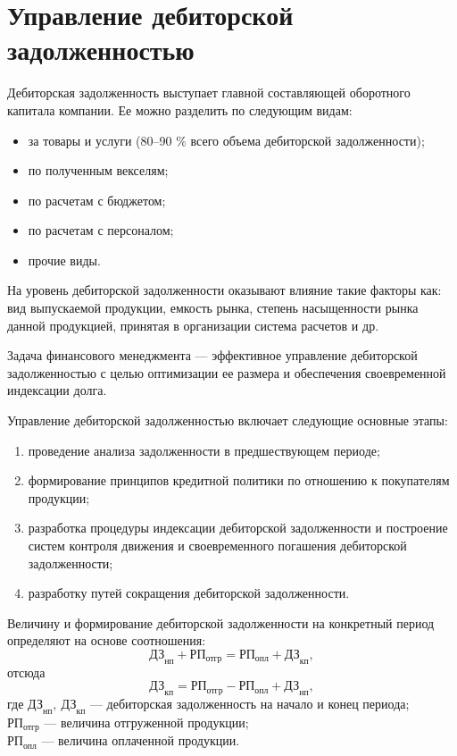 \section{Управление дебиторской задолженностью}

Дебиторская задолженность выступает главной составляющей оборотного капитала компании. Ее можно разделить по следующим видам:
\begin{itemize}
	\item за товары и услуги (80--90 \% всего объема дебиторской задолженности);
	\item по полученным векселям;
	\item по расчетам с бюджетом;
	\item по расчетам с персоналом;
	\item прочие виды.
\end{itemize}

На уровень дебиторской задолженности оказывают влияние такие факторы как: вид выпускаемой продукции, емкость рынка, степень насыщенности рынка данной продукцией, принятая в организации система расчетов и др.

Задача финансового менеджмента --- эффективное управление дебиторской задолженностью с целью оптимизации ее размера и обеспечения своевременной индексации долга.

Управление дебиторской задолженностью включает следующие основные этапы:
\begin{enumerate}
	\item проведение анализа задолженности в предшествующем периоде;
	\item формирование принципов кредитной политики по отношению к покупателям продукции;
	\item разработка процедуры индексации дебиторской задолженности и построение систем контроля движения и своевременного  погашения дебиторской задолженности;
	\item разработку путей сокращения дебиторской задолженности.
\end{enumerate}

Величину и формирование дебиторской задолженности на конкретный период определяют на основе соотношения:
\[ \text{ДЗ}_\text{нп} + \text{РП}_\text{отгр} =\text{РП}_\text{опл} + \text{ДЗ}_\text{кп} , \]
отсюда
\[ \text{ДЗ}_\text{кп} = \text{РП}_\text{отгр} - \text{РП}_\text{опл} + \text{ДЗ}_\text{нп} , \]
где $ \text{ДЗ}_\text{нп} ,\  \text{ДЗ}_\text{кп}$ — дебиторская задолженность на начало и конец периода;\\
$\text{РП}_\text{отгр}$  — величина отгруженной продукции;\\
$\text{РП}_\text{опл}$ — величина оплаченной продукции.

